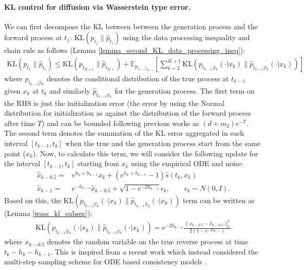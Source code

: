 \documentclass{article}
\newcommand{\E}{\mathbb{E}}
\newcommand{\KL}[2]{\mathrm{KL}\left(#1 \big\| #2\right)}
\begin{document}
{
\paragraph{KL control for diffusion via Wasserstein type error.} We can first decompose the KL between between the generation process and the forward process at $t_1$: $\KL{p_{t_1}}{\hat{p}_{t_1}}$ using the data processing inequality and chain rule as follows  (Lemma \ref{lemma_second_KL_data_processing_ineq}):
\begin{align*}
   \KL{p_{t_1}}{\hat{p}_{t_1}} \leq  \KL{{p}_{t_{K+1}}}{\hat{p}_{t_{K+}}} + 
   \E_{{p}_{t_1,..,t_{K+1}}} \left[ \sum_{k=2}^{K+1}
       \KL{{p}_{t_{k-1}|t_k}(\cdot|{x}_{k})}{\hat{p}_{t_{k-1}|t_k}(\cdot|{x}_k)}\right]
\end{align*}
where $p_{t_{k-1}|t_k}$ denotes the conditional distribution of the true process at $t_{k-1}$ given $x_k$ at $t_k$ and similarly $\hat{p}_{t_{k-1}|t_k}$ for the generation process. 
The first term on the RHS is just the initialization error (the error by using the Normal distribution for initialization as against the distribution of the forward process after time $T$) and can be bounded following previous works \cite{chen2022sampling, chen2023improved} as $(d+m_2)e^{-T}$. The second term denotes the summation of the KL error aggregated in each interval $[t_{k-1},t_k]$ when the true and the generation process start from the same point ($x_k$). Now, to calculate this term, we will consider the following update for the interval $[t_{k-1},t_{k}]$ starting from $x_k$ using the empirical ODE and noise:
\begin{align}
  \hat{x}_{k-0.5} = &
 e^{h_k + h_{k-1}} x_{k} +
 (e^{h_k + h_{k-1}}-1) 
 \hat{s}(t_{k},{x}_{{k}}) \label{eq_empirical_gen_first}\\
  \hat{x}_{k-1} 
  =& e^{-h_{k-1}} \hat{x}_{k-0.5} 
 + \sqrt{1-e^{-2 h_{k-1}}} \epsilon_k , \qquad \epsilon_k \sim N(0,I). \label{eq_empirical_gen_second}
\end{align}
Based on this, the $\KL{{p}_{t_{k-1}|t_k}(\cdot|{x}_{k})}{\hat{p}_{t_{k-1}|t_k}(\cdot|{x}_k)}$ term can be written as (Lemma \ref{wass_kl_subsec}):
\begin{align*}
    \KL{{p}_{t_{k-1}|t_k}(\cdot|{x}_{k})}{\hat{p}_{t_{k-1}|t_k}(\cdot|{x}_k)} =  e^{-2h_{{k-1}}}
    \frac{\|
      x_{k-0.5}-\hat{x}_{k-0.5}\|_2^2}
    {2 (1  -e^{-2h_{k-1}})}    
\end{align*}
where $x_{k-0.5}$ denotes the random variable on the true reverse process at time $t_k-h_k - h_{k-1}$. This is inspired from a recent work \cite{jain2025multi} which instead considered the multi-step sampling scheme for ODE based consistency models \cite{song2023consistency}.
}
\end{document}
